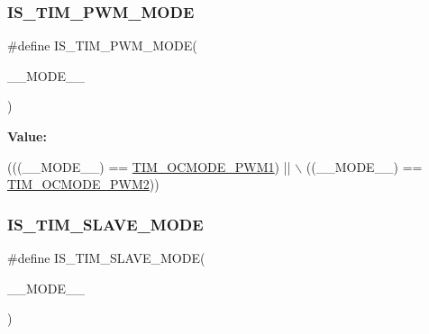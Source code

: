 \subsubsection{\texorpdfstring{I\+S\+\_\+\+T\+I\+M\+\_\+\+P\+W\+M\+\_\+\+M\+O\+DE}{IS\_TIM\_PWM\_MODE}}
{\footnotesize\ttfamily \#define I\+S\+\_\+\+T\+I\+M\+\_\+\+P\+W\+M\+\_\+\+M\+O\+DE(\begin{DoxyParamCaption}\item[{}]{\+\_\+\+\_\+\+M\+O\+D\+E\+\_\+\+\_\+ }\end{DoxyParamCaption})}

{\bfseries Value\+:}
\begin{DoxyCode}
(((\_\_MODE\_\_) == \hyperlink{group___t_i_m___output___compare__and___p_w_m__modes_ga766271da571888dfecd9130c3887e9c6}{TIM\_OCMODE\_PWM1})               || \(\backslash\)
                                   ((\_\_MODE\_\_) == \hyperlink{group___t_i_m___output___compare__and___p_w_m__modes_ga88ce4251743c2c07e19fdd5a0a310580}{TIM\_OCMODE\_PWM2}))
\end{DoxyCode}
\mbox{\label{group___t_i_m___private___macros_gafce89506518ce113eb70e424f4dc1c5b}} 
\subsubsection{\texorpdfstring{I\+S\+\_\+\+T\+I\+M\+\_\+\+S\+L\+A\+V\+E\+\_\+\+M\+O\+DE}{IS\_TIM\_SLAVE\_MODE}}
{\footnotesize\ttfamily \#define I\+S\+\_\+\+T\+I\+M\+\_\+\+S\+L\+A\+V\+E\+\_\+\+M\+O\+DE(\begin{DoxyParamCaption}\item[{}]{\+\_\+\+\_\+\+M\+O\+D\+E\+\_\+\+\_\+ }\end{DoxyParamCaption})}

